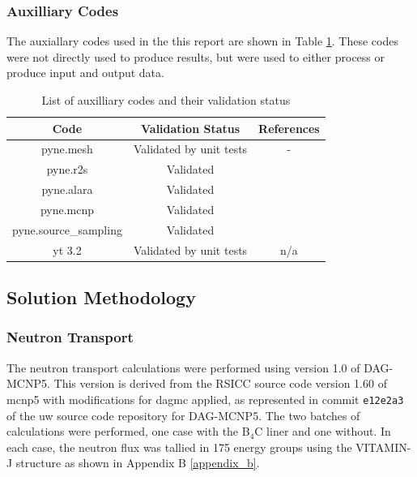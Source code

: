 \documentclass[12pt]{article}
\begin{document}
\subsubsection*{Auxilliary Codes}
The auxiallary codes used in the this report are shown in Table 
\ref{table:validation_aux}. These codes were not directly used to 
produce results, but were used to either process or produce input
and output data.
\begin{centering}
 \begin{table}[ht!]
  \begin{tabular}{c | c | c}
  \hline
  Code & Validation Status & References \\    
  \hline
  pyne.mesh & Validated by unit tests & - \\
  pyne.r2s & Validated & \cite{pyne_r2s} \\
  pyne.alara & Validated & \cite{pyne_r2s} \\
  pyne.mcnp & Validated & \cite{pyne_r2s} \\
  pyne.source\_sampling & Validated & \cite{pyne_r2s} \\
  yt 3.2 & Validated by unit tests & n/a \\
 \end{tabular}
 \caption{List of auxilliary codes and their validation status}
 \label{table:validation_aux}
 \end{table}
\end{centering}

\newpage
\subsection{Solution Methodology}
\label{section:method}
\subsubsection{Neutron Transport}
The neutron transport calculations were performed using version 1.0 of DAG-MCNP5.
This version is derived from the RSICC source code version 1.60 of \gls{mcnp5}
with modifications for \gls{dagmc} applied, as represented in commit \texttt{e12e2a3}
of the \gls{uw} source code repository for DAG-MCNP5.
The two batches of calculations were performed, one
case with the B$_4$C liner and one without.  
In each case, the neutron flux was tallied in 175 energy groups using the
VITAMIN-J structure \cite{vitaminj} as shown in Appendix B \ref{appendix_b}.
\end{document}
